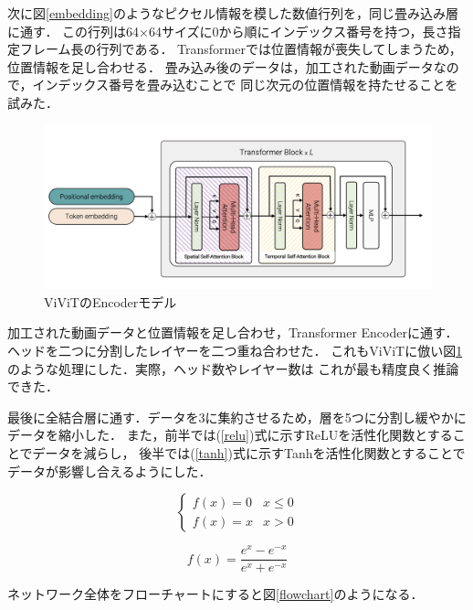 次に図\ref{embedding}のようなピクセル情報を模した数値行列を，同じ畳み込み層に通す．
この行列は64×64サイズに0から順にインデックス番号を持つ，長さ指定フレーム長の行列である．
Transformerでは位置情報が喪失してしまうため，位置情報を足し合わせる．
畳み込み後のデータは，加工された動画データなので，インデックス番号を畳み込むことで
同じ次元の位置情報を持たせることを試みた．
\clearpage

\begin{figure}[t]
  \begin{center}
    \includegraphics[width=130mm]{images/quote/encoder.png}
  \end{center}
  \caption{ViViTのEncoderモデル}
  \label{encoder}
\end{figure}

加工された動画データと位置情報を足し合わせ，Transformer Encoderに通す．
ヘッドを二つに分割したレイヤーを二つ重ね合わせた．
これもViViTに倣い図\ref{encoder}のような処理にした．実際，ヘッド数やレイヤー数は
これが最も精度良く推論できた．

最後に全結合層に通す．データを3に集約させるため，層を5つに分割し緩やかにデータを縮小した．
また，前半では(\ref{relu})式に示すReLUを活性化関数とすることでデータを減らし，
後半では(\ref{tanh})式に示すTanhを活性化関数とすることでデータが影響し合えるようにした．

\begin{equation}
  \left\{
    \begin{array}{ll}
      f(x) = 0 & x \leq 0 \\
      f(x) = x & x > 0
    \end{array}
  \right.
  \label{relu}
\end{equation}

\begin{equation}
  f(x) = \frac{e^x - e^{-x}}{e^x + e^{-x}}
  \label{tanh}
\end{equation}

ネットワーク全体をフローチャートにすると図\ref{flowchart}のようになる．

